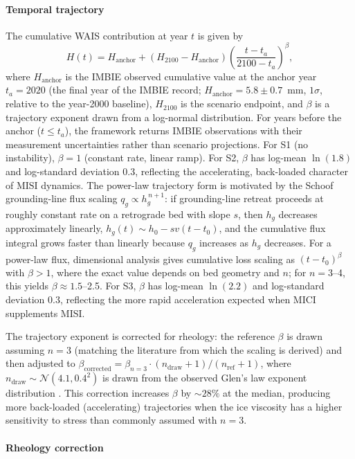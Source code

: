 \documentclass[12pt]{article}
\newcommand{\subsubsubsection}[1]{\paragraph{#1}\mbox{}\par}
\begin{document}
\subsubsubsection{Temporal trajectory}

The cumulative WAIS contribution at year $t$ is given by
\begin{equation}
H(t) = H_{\mathrm{anchor}} + (H_{2100} - H_{\mathrm{anchor}}) \left(\frac{t - t_a}{2100 - t_a}\right)^\beta,
\label{eq:wais_trajectory}
\end{equation}
where $H_{\mathrm{anchor}}$ is the IMBIE observed cumulative value at the anchor year $t_a = 2020$ (the final year of the IMBIE record; $H_{\mathrm{anchor}} = 5.8 \pm 0.7$~mm, $1\sigma$, relative to the year-2000 baseline), $H_{2100}$ is the scenario endpoint, and $\beta$ is a trajectory exponent drawn from a log-normal distribution. For years before the anchor ($t \leq t_a$), the framework returns IMBIE observations with their measurement uncertainties rather than scenario projections. For S1 (no instability), $\beta = 1$ (constant rate, linear ramp). For S2, $\beta$ has log-mean $\ln(1.8)$ and log-standard deviation 0.3, reflecting the accelerating, back-loaded character of MISI dynamics. The power-law trajectory form is motivated by the Schoof~\citep{Schoof2007} grounding-line flux scaling $q_g \propto h_g^{\,n+1}$: if grounding-line retreat proceeds at roughly constant rate on a retrograde bed with slope $s$, then $h_g$ decreases approximately linearly, $h_g(t) \sim h_0 - sv(t - t_0)$, and the cumulative flux integral grows faster than linearly because $q_g$ increases as $h_g$ decreases. For a power-law flux, dimensional analysis gives cumulative loss scaling as $(t - t_0)^\beta$ with $\beta > 1$, where the exact value depends on bed geometry and $n$; for $n = 3$--4, this yields $\beta \approx 1.5$--2.5. For S3, $\beta$ has log-mean $\ln(2.2)$ and log-standard deviation 0.3, reflecting the more rapid acceleration expected when MICI supplements MISI.

The trajectory exponent is corrected for rheology: the reference $\beta$ is drawn assuming $n = 3$ (matching the literature from which the scaling is derived) and then adjusted to $\beta_{\mathrm{corrected}} = \beta_{n=3} \cdot (n_{\mathrm{draw}} + 1)/(n_{\mathrm{ref}} + 1)$, where $n_{\mathrm{draw}} \sim \mathcal{N}(4.1, 0.4^2)$ is drawn from the observed Glen's law exponent distribution \citep{Millstein2022, Ranganathan2024}. This correction increases $\beta$ by ${\sim}28\%$ at the median, producing more back-loaded (accelerating) trajectories when the ice viscosity has a higher sensitivity to stress than commonly assumed with $n=3$.

\subsubsubsection{Rheology correction}
\end{document}

